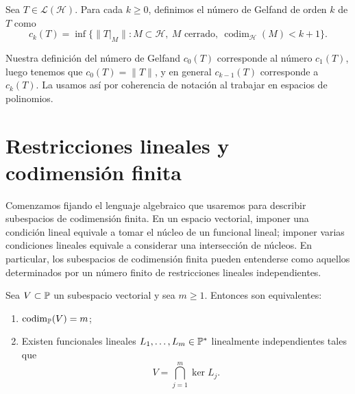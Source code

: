 \begin{defn}\label{def:numeros_gelfand}
	Sea $T\in\mathcal L(\mathcal H)$. Para cada $k\ge 0$, definimos el número de Gelfand de orden $k$ de $T$ como
	\begin{equation}\label{eq:gelfand_numbers}
		c_k(T)=\inf\{\|T|_M\|:M\subset \mathcal H,\ M\text{ cerrado},\ \operatorname{codim}_{\mathcal H}(M)<k+1\}.
	\end{equation}
\end{defn}

\begin{rmk}
	Nuestra definición del número de Gelfand $c_0(T)$ corresponde al número $c_1(T)$, luego tenemos que  $c_0(T)=\|T\|$, y en general $c_{k-1}(T)$ corresponde a $c_k(T)$. La usamos así por coherencia de notación al trabajar en espacios de polinomios.
\end{rmk}

\section{Restricciones lineales y codimensión finita}

Comenzamos fijando el lenguaje algebraico que usaremos para describir subespacios de codimensión finita. En un espacio vectorial, imponer una condición lineal equivale a tomar el núcleo de un funcional lineal; imponer varias condiciones lineales equivale a considerar una intersección de núcleos. En particular, los subespacios de codimensión finita pueden entenderse como aquellos determinados por un número finito de restricciones lineales independientes.

\begin{prop}\label{prop:finite-codim-kernels}
	Sea $V\subset \mathbb{P}$ un subespacio vectorial y sea $m \geq 1$. Entonces son equivalentes:
	\begin{enumerate}
		\item $\operatorname{codim}_{\mathbb{P}}(V)=m$;
		\item Existen funcionales lineales $L_1,\dots,L_m\in\mathbb{P}^*$ linealmente independientes tales que
		      \[
			      V=\bigcap_{j=1}^m \ker L_j.
		      \]
	\end{enumerate}
\end{prop}

